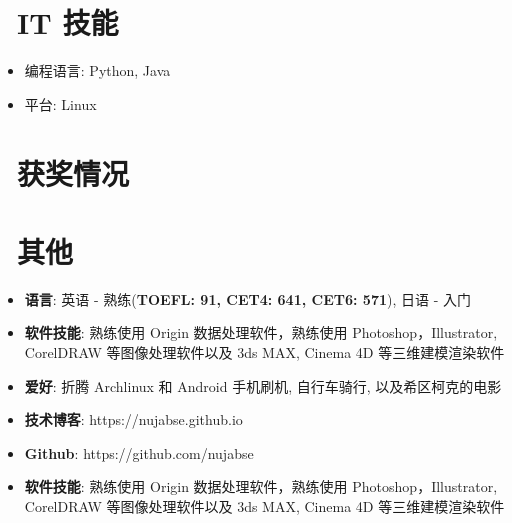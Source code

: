 \documentclass{resume}
\begin{document}
\section{\faCogs\ IT 技能}
\begin{itemize}[parsep=0.5ex]
  \item 编程语言: Python, Java
  \item 平台: Linux
\end{itemize}

\section{\faHeartO\ 获奖情况}

\section{\faInfo\ 其他}
\begin{itemize}[parsep=0.5ex]
  \item \textbf{语言}: 英语 - 熟练(\textbf{TOEFL: 91,  CET4: 641, CET6: 571}), 日语 - 入门
  \item \textbf{软件技能}: 熟练使用 Origin 数据处理软件，熟练使用 Photoshop，Illustrator, CorelDRAW 等图像处理软件以及 3ds MAX, Cinema 4D 等三维建模渲染软件
  \item \textbf{爱好}: 折腾 Archlinux 和 Android 手机刷机, 自行车骑行, 以及希区柯克的电影
  \item \textbf{技术博客}: https://nujabse.github.io
  \item \textbf{Github}: https://github.com/nujabse
  \item \textbf{软件技能}: 熟练使用 Origin 数据处理软件，熟练使用 Photoshop，Illustrator, CorelDRAW 等图像处理软件以及 3ds MAX, Cinema 4D 等三维建模渲染软件
\end{itemize}

%
%
\end{document}
